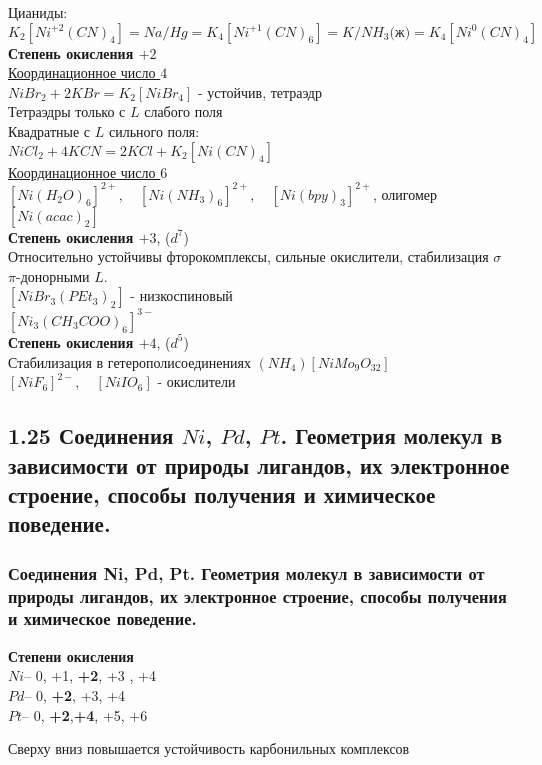 Цианиды:
\[
K_2\left[Ni^{+2}(CN)_4 \right] = Na/Hg = K_4\left[Ni^{+1}(CN)_6 \right] = K/NH_3\text{(ж)} = K_4\left[Ni^{0}(CN)_4 \right]
\]
\textbf{Степень окисления $+2$}\\
\ul{Координационное число $4$} \\
$NiBr_2 + 2KBr = K_2\left[NiBr_4 \right]$ - устойчив, тетраэдр \\
Тетраэдры только с $L$ слабого поля \\
Квадратные с $L$ сильного поля: \\
$NiCl_2 + 4 KCN = 2 KCl + K_2\left[Ni(CN)_4 \right]$ \\
\ul{Координационное число $6$} \\
$\left[Ni(H_2O)_6 \right]^{2+}, \quad \left[Ni(NH_3)_6 \right]^{2+}, \quad \left[Ni(bpy)_3 \right]^{2+}$, олигомер $\left[Ni(acac)_2 \right]$ \\
\textbf{Степень окисления $+3$}, ($d^7$)\\
Относительно устойчивы фторокомплексы, сильные окислители, стабилизация $\sigma$ $\pi$-донорными $L$. \\
$ \left[NiBr_3(PEt_3)_2 \right] $ - низкоспиновый \\
$ \left[Ni_3(CH_3COO)_6 \right]^{3-} $ \\
\textbf{Степень окисления $+4$}, ($d^5$)\\
Стабилизация в гетерополисоединениях $(NH_4)\left[NiMo_9O_{32}\right]$ \\
$\left[NiF_6\right]^{2-}, \quad \left[NiIO_6\right]$ - окислители

\subsection{1.25 Соединения $Ni$, $Pd$, $Pt$. Геометрия молекул в зависимости от природы лигандов, их электронное строение, способы получения и химическое поведение.}
\subsubsection*{ Соединения Ni, Pd, Pt. Геометрия молекул в зависимости от природы лигандов, их электронное строение, способы получения и химическое поведение.}

\textbf{Степени окисления}\\
$Ni$-- 0, +1, \textbf{+2}, +3 , +4\\
$Pd$-- 0, \textbf{+2}, +3, +4\\
$Pt$-- 0, \textbf{+2},\textbf{+4}, +5, +6

Сверху вниз повышается устойчивость карбонильных комплексов

